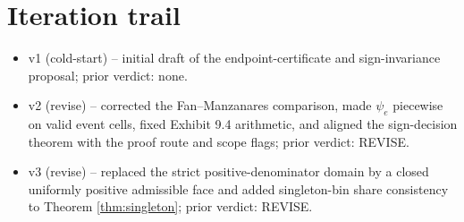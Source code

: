 \documentclass[11pt]{article}
\theoremstyle{definition}
\theoremstyle{plain}
\theoremstyle{remark}
\begin{document}
\section{Iteration trail}
\begin{itemize}[leftmargin=*]
\item v1 (cold-start) -- initial draft of the endpoint-certificate and sign-invariance proposal; prior verdict: none.
\item v2 (revise) -- corrected the Fan--Manzanares comparison, made \(\psi_e\) piecewise on valid event cells, fixed Exhibit 9.4 arithmetic, and aligned the sign-decision theorem with the proof route and scope flags; prior verdict: REVISE.
\item v3 (revise) -- replaced the strict positive-denominator domain by a closed uniformly positive admissible face and added singleton-bin share consistency to Theorem \ref{thm:singleton}; prior verdict: REVISE.
\end{itemize}
\end{document}
